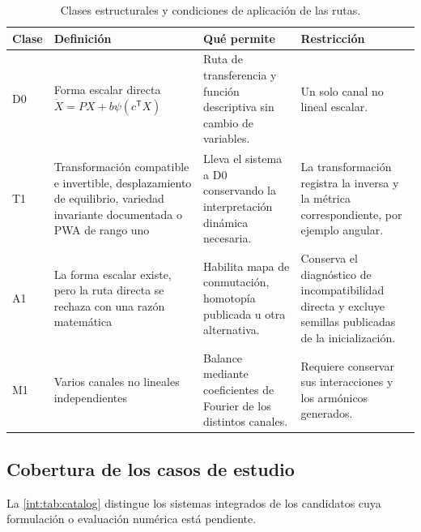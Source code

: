 \begin{table}[H]
\centering
\caption{Clases estructurales y condiciones de aplicación de las rutas.}
\small
\begin{tabularx}{\textwidth}{@{}C{1.1cm}p{0.24\textwidth}Yp{0.25\textwidth}@{}}
\toprule
Clase & Definición & Qué permite & Restricción \\
\midrule
D0 & Forma escalar directa \(\dot X=PX+b\psi(c^{\mathsf T}X)\) &
Ruta de transferencia y función descriptiva sin cambio de variables. &
Un solo canal no lineal escalar. \\
T1 & Transformación compatible e invertible, desplazamiento de equilibrio,
variedad invariante documentada o PWA de rango uno &
Lleva el sistema a D0 conservando la interpretación dinámica necesaria. &
La transformación registra la inversa y la métrica correspondiente, por ejemplo angular. \\
A1 & La forma escalar existe, pero la ruta directa se rechaza con una razón
matemática &
Habilita mapa de conmutación, homotopía publicada u otra alternativa. &
Conserva el diagnóstico de incompatibilidad directa y excluye semillas
publicadas de la inicialización. \\
M1 & Varios canales no lineales independientes &
Balance mediante coeficientes de Fourier de los distintos canales. &
Requiere conservar sus interacciones y los armónicos generados. \\
\bottomrule
\end{tabularx}
\end{table}

\subsection{Cobertura de los casos de estudio}

La \cref{int:tab:catalog} distingue los sistemas integrados de los candidatos
cuya formulación o evaluación numérica está pendiente.


